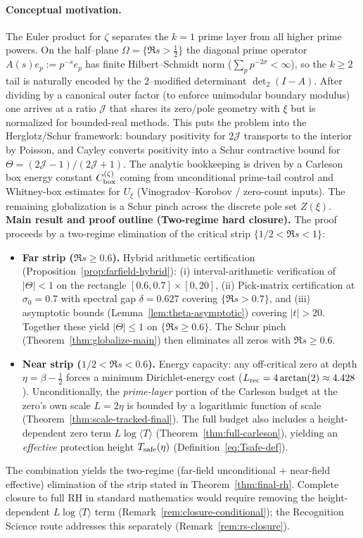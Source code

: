 \documentclass[11pt]{article}
\theoremstyle{definition}
\theoremstyle{remark}
\theoremstyle{definition}
\begin{document}
\paragraph{Conceptual motivation.} The Euler product for $\zeta$ separates the $k=1$ prime layer from all higher prime powers. On the half–plane $\Omega=\{\Re s>\tfrac12\}$ the diagonal prime operator $A(s)e_p:=p^{-s}e_p$ has finite Hilbert–Schmidt norm ($\sum_p p^{-2\sigma}<\infty$), so the $k\ge2$ tail is naturally encoded by the $2$--modified determinant $\det_2(I-A)$. After dividing by a canonical outer factor (to enforce unimodular boundary modulus) one arrives at a ratio $\mathcal J$ that shares its zero/pole geometry with $\xi$ but is normalized for bounded-real methods. This puts the problem into the Herglotz/Schur framework: boundary positivity for $2\mathcal J$ transports to the interior by Poisson, and Cayley converts positivity into a Schur contractive bound for $\Theta=(2\mathcal J-1)/(2\mathcal J+1)$. The analytic bookkeeping is driven by a Carleson box energy constant $C_{\rm box}^{(\zeta)}$ coming from unconditional prime-tail control and Whitney-box estimates for $U_\xi$ (Vinogradov--Korobov / zero-count inputs). The remaining globalization is a Schur pinch across the discrete pole set $Z(\xi)$.
\noindent\textbf{Main result and proof outline (Two-regime hard closure).}
The proof proceeds by a two-regime elimination of the critical strip $\{1/2<\Re s<1\}$:
\begin{itemize}
\item \textbf{Far strip ($\Re s\ge 0.6$).} Hybrid arithmetic certification (Proposition~\ref{prop:farfield-hybrid}): (i) interval-arithmetic verification of $|\Theta| < 1$ on the rectangle $[0.6, 0.7] \times [0, 20]$, (ii) Pick-matrix certification at $\sigma_0 = 0.7$ with spectral gap $\delta = 0.627$ covering $\{\Re s > 0.7\}$, and (iii) asymptotic bounds (Lemma~\ref{lem:theta-asymptotic}) covering $|t| > 20$. Together these yield $|\Theta|\le 1$ on $\{\Re s\ge 0.6\}$. The Schur pinch (Theorem~\ref{thm:globalize-main}) then eliminates all zeros with $\Re s \ge 0.6$.
\item \textbf{Near strip ($1/2<\Re s<0.6$).} Energy capacity: any off-critical zero at depth $\eta=\beta-\tfrac12$ forces a minimum Dirichlet-energy cost ($L_{\rm rec} = 4\arctan(2) \approx 4.428$). Unconditionally, the \emph{prime-layer} portion of the Carleson budget at the zero's own scale $L=2\eta$ is bounded by a logarithmic function of scale (Theorem~\ref{thm:scale-tracked-final}). The full budget also includes a height-dependent zero term $L\log\langle T\rangle$ (Theorem~\ref{thm:full-carleson}), yielding an \emph{effective} protection height $T_{\rm safe}(\eta)$ (Definition~\eqref{eq:Tsafe-def}).
\end{itemize}
\noindent The combination yields the two-regime (far-field unconditional + near-field effective) elimination of the strip stated in Theorem~\ref{thm:final-rh}. Complete closure to full RH in standard mathematics would require removing the height-dependent $L\log\langle T\rangle$ term (Remark~\ref{rem:closure-conditional}); the Recognition Science route addresses this separately (Remark~\ref{rem:rs-closure}).
\end{document}
